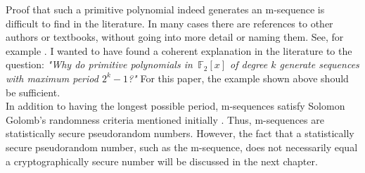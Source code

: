 Proof that such a primitive polynomial indeed generates an m-sequence is difficult to find in the literature. In many cases there are references to other authors or textbooks, without going into more detail or naming them. See, for example \cite[p. 229]{Smart.2016}. I wanted to have found a coherent explanation in the literature to the question: \textit{"Why do primitive polynomials in $\,\mathbb{F}_2[x]$ of degree $k$ generate sequences with maximum period $2^{k}-1$?"} For this paper, the example shown above should be sufficient. \\

In addition to having the longest possible period, m-sequences satisfy Solomon Golomb's randomness criteria mentioned initially \cite[p. 2847]{Gong.2018}. Thus, m-sequences are statistically secure pseudorandom numbers. However, the fact that a statistically secure pseudorandom number, such as the m-sequence, does not necessarily equal a cryptographically secure number will be discussed in the next chapter.

\pagebreak